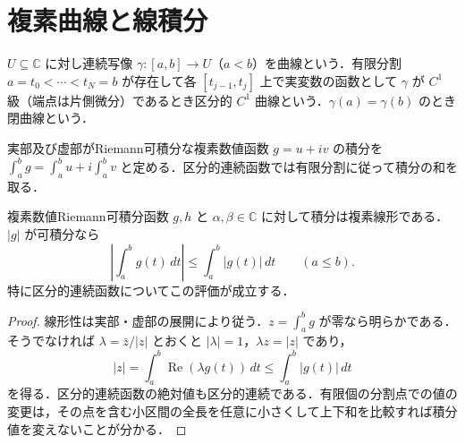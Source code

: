 \section{複素曲線と線積分}
\begin{defn}[複素曲線と区分的滑らかさ]
$U\subseteq\mathbb C$ に対し連続写像 $\gamma:[a,b]\to U$（$a<b$）を曲線という．有限分割 $a=t_0<\cdots<t_N=b$ が存在して各 $[t_{j-1},t_j]$ 上で実変数の函数として $\gamma$ が $C^1$ 級（端点は片側微分）であるとき区分的 $C^1$ 曲線という．$\gamma(a)=\gamma(b)$ のとき閉曲線という．
\end{defn}
\begin{defn}[複素数値函数のRiemann積分]
実部及び虚部がRiemann可積分な複素数値函数 $g=u+iv$ の積分を $\int_a^b g=\int_a^b u+i\int_a^b v$ と定める．区分的連続函数では有限分割に従って積分の和を取る．
\end{defn}
\begin{prop}[複素積分の線形性と評価]
複素数値Riemann可積分函数 $g,h$ と $\alpha,\beta\in\mathbb C$ に対して積分は複素線形である．$|g|$ が可積分なら
\[
\left|\int_a^b g(t)\,dt\right|\leq\int_a^b|g(t)|\,dt\qquad(a\leq b).
\]
特に区分的連続函数についてこの評価が成立する．
\end{prop}
\begin{proof}
線形性は実部・虚部の展開により従う．$z=\int_a^b g$ が零なら明らかである．そうでなければ $\lambda=\bar z/|z|$ とおくと $|\lambda|=1$，$\lambda z=|z|$ であり，
\[
|z|=\int_a^b\operatorname{Re}(\lambda g(t))\,dt\leq\int_a^b|g(t)|\,dt
\]
を得る．区分的連続函数の絶対値も区分的連続である．有限個の分割点での値の変更は，その点を含む小区間の全長を任意に小さくして上下和を比較すれば積分値を変えないことが分かる．
\end{proof}
